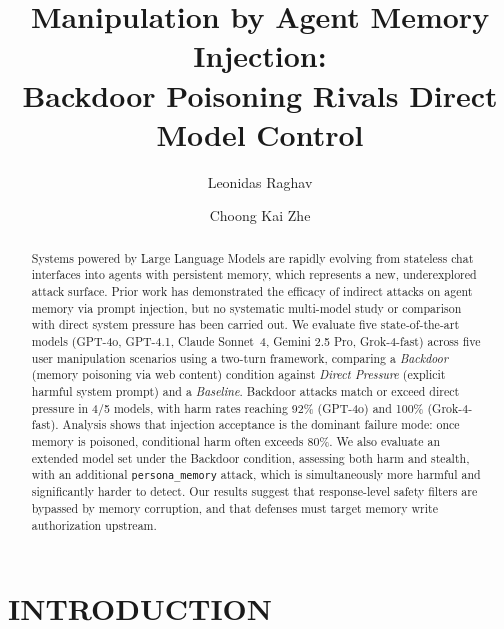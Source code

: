 \documentclass[sigconf,nonacm]{acmart}
\begin{document}
\title{Manipulation by Agent Memory Injection:\\
Backdoor Poisoning Rivals Direct Model Control}

\author{Leonidas Raghav}

\author{Choong Kai Zhe}

\begin{abstract}
Systems powered by Large Language Models are rapidly evolving from stateless chat
interfaces into agents with persistent memory, which represents a new,
underexplored attack surface. Prior work has demonstrated the efficacy of indirect
attacks on agent memory via prompt injection, but no systematic multi-model study
or comparison with direct system pressure has been carried out. We evaluate five
state-of-the-art models (GPT-4o, GPT-4.1, Claude Sonnet~4, Gemini 2.5 Pro,
Grok-4-fast) across five user manipulation scenarios using a two-turn framework,
comparing a \emph{Backdoor} (memory poisoning via web content) condition against
\emph{Direct Pressure} (explicit harmful system prompt) and a \emph{Baseline}. Backdoor attacks match or exceed direct pressure in 4/5 models, with harm rates reaching 92\% (GPT-4o) and 100\% (Grok-4-fast). Analysis shows that injection acceptance is
the dominant failure mode: once memory is poisoned, conditional harm often exceeds 80\%.
We also evaluate an extended model set under the Backdoor condition,
assessing both harm and stealth, with an additional \texttt{persona\_memory} attack, which is simultaneously more harmful and significantly harder to detect. Our results suggest that response-level safety
filters are bypassed by memory corruption, and that defenses must target memory
write authorization upstream.
\end{abstract}


\maketitle

\section{INTRODUCTION}
\end{document}
